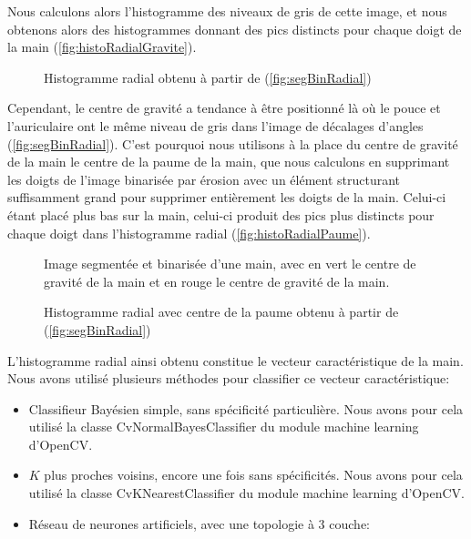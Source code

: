 Nous calculons alors l'histogramme des niveaux de gris de cette image, et nous obtenons alors des histogrammes donnant des pics distincts pour chaque doigt de la main (\autoref{fig:histoRadialGravite}).

\begin{figure}[htb!]
\caption{Histogramme radial obtenu à partir de (\autoref{fig:segBinRadial})}
\label{fig:histoRadialGravite}
\end{figure}

Cependant, le centre de gravité a tendance à être positionné là où le pouce et l'auriculaire ont le même niveau de gris dans l'image de décalages d'angles (\autoref{fig:segBinRadial}). C'est pourquoi nous utilisons à la place du centre de gravité de la main le centre de la paume de la main, que nous calculons en supprimant les doigts de l'image binarisée par érosion avec un élément structurant suffisamment grand pour supprimer entièrement les doigts de la main. Celui-ci étant placé plus bas sur la main, celui-ci produit des pics plus distincts pour chaque doigt dans l'histogramme radial (\autoref{fig:histoRadialPaume}).

\begin{figure}[htb!]
\caption{Image segmentée et binarisée d'une main, avec en vert le centre de gravité de la main et en rouge le centre de gravité de la main.}
\label{fig:segBinRadialCentres}
\end{figure}

\begin{figure}[htb!]
\caption{Histogramme radial avec centre de la paume obtenu à partir de (\autoref{fig:segBinRadial})}
\label{fig:histoRadialPaume}
\end{figure}

L'histogramme radial ainsi obtenu constitue le vecteur caractéristique de la main. Nous avons utilisé plusieurs méthodes pour classifier ce vecteur caractéristique:

\begin{itemize}
\item Classifieur Bayésien simple, sans spécificité particulière. Nous avons pour cela utilisé la classe CvNormalBayesClassifier du module machine learning d'OpenCV.
\item $K$ plus proches voisins, encore une fois sans spécificités. Nous avons pour cela utilisé la classe CvKNearestClassifier du module machine learning d'OpenCV.
\item Réseau de neurones artificiels, avec une topologie à $3$ couche:
\end{itemize}

